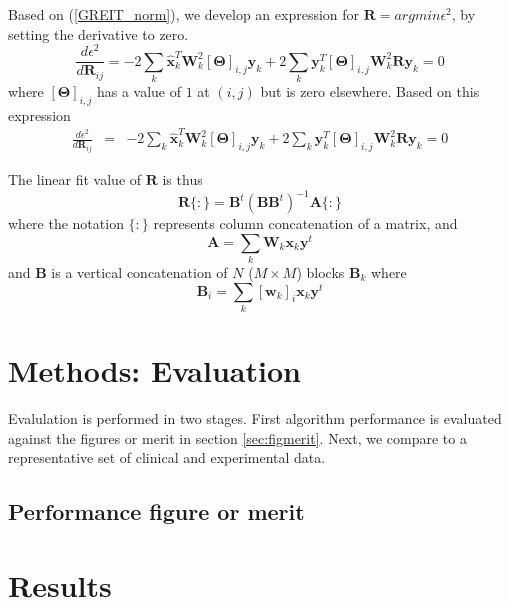 \documentclass[12pt]{iopart}
\newcommand{\xB}{\mbox{$\mathbf{x}$}}
\newcommand{\xH}{\mbox{$\mathbf{\hat x}$}}
\newcommand{\yB}{\mbox{$\mathbf{y}$}}
\newcommand{\wB}{\mbox{$\mathbf{w}$}}
\newcommand{\AB}{\mbox{$\mathbf{A}$}}
\newcommand{\BB}{\mbox{$\mathbf{B}$}}
\newcommand{\RB}{\mbox{$\mathbf{R}$}}
\newcommand{\WB}{\mbox{$\mathbf{W}$}}
\newcommand{\TG}{\mbox{${\mathbf \Theta}$}}
\begin{document}
Based on (\ref{GREIT_norm}), we develop an expression
for $\RB = argmin \epsilon^2$, by setting the
derivative to zero.
\begin{equation}
\frac{ d\epsilon^2 }{ d\RB_{ij} } =
-2 \sum_k \xH_k^T \WB^2_k [\TG]_{i,j} \yB_k
+2 \sum_k \yB_k^T [\TG]_{i,j} \WB^2_k \RB \yB_k
= 0
\end{equation}
where $[\TG]_{i,j}$ has a value of $1$ at $(i,j)$
but is zero elsewhere. Based on this expression
\begin{eqnarray}
\frac{ d\epsilon^2 }{ d\RB_{ij} } & = &
-2 \sum_k \xH_k^T \WB^2_k [\TG]_{i,j} \yB_k
+2 \sum_k \yB_k^T [\TG]_{i,j} \WB^2_k \RB \yB_k
= 0
\end{eqnarray}


The linear fit value of $\RB$ is thus
\begin{equation}
\RB\{:\} = \BB^t (\BB \BB^t)^{-1} \AB\{:\}
\end{equation}
where the notation $\{:\}$ represents column
concatenation of a matrix, and
\begin{equation}
\AB = \sum_k \WB_k \xB_k \yB^t
\end{equation}
and $\BB$ is a vertical concatenation of $N$
($M \times M$) blocks $\BB_k$ where
\begin{equation}
\BB_i = \sum_k [\wB_k]_i \xB_k \yB^t
\end{equation}




\section{Methods: Evaluation}

Evalulation is performed in two stages. First algorithm performance
is evaluated against the figures or merit in section
\ref{sec:figmerit}.
Next, we compare to a representative set of  clinical 
and experimental data.

\subsection{Performance figure or merit}


\section{Results}
\end{document}
